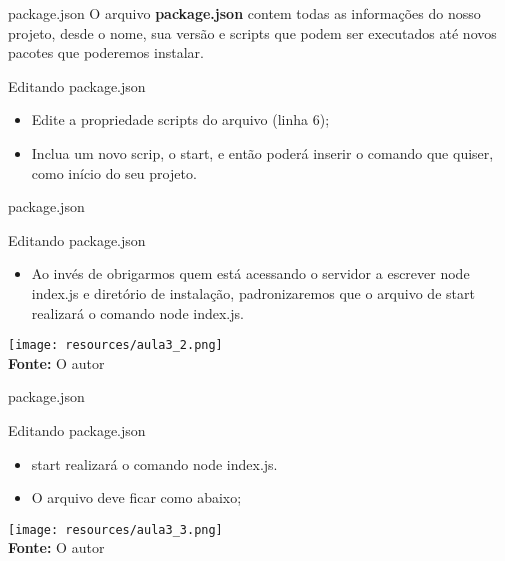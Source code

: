 \documentclass{beamer}
\begin{document}
    \begin{frame}[label=lists]{package.json}
	O arquivo \textbf{package.json} contem todas as informações do nosso projeto, desde o nome, sua versão e scripts que podem ser executados até novos pacotes que poderemos instalar.\\
	\begin{exampleblock}{Editando package.json}
	\begin{itemize}
	\item Edite a propriedade scripts do arquivo (linha 6);
	\item Inclua um novo scrip, o start, e então poderá inserir o comando que quiser, como início do seu projeto. 

	\end{itemize}
	\end{exampleblock}

    \end{frame}
    \begin{frame}[label=lists]{package.json}
		\begin{exampleblock}{Editando package.json}
	\begin{itemize}
	\item Ao invés de obrigarmos quem está acessando o servidor a escrever node index.js e diretório de instalação, padronizaremos que o arquivo de start realizará o comando \alert{node index.js}.
	\end{itemize}
	\end{exampleblock}
	 \texttt{[image: resources/aula3\_2.png]}\\
            \tiny{\textbf{Fonte:} O autor}

    \end{frame}
   
    \begin{frame}[label=lists]{package.json}
		\begin{exampleblock}{Editando package.json}
	\begin{itemize}
	\item start realizará o comando \alert{node index.js}.
	\item O arquivo deve ficar como abaixo;
	\end{itemize}
	\end{exampleblock}
	 \texttt{[image: resources/aula3\_3.png]}\\
            \tiny{\textbf{Fonte:} O autor}

    \end{frame}
   
\end{document}

